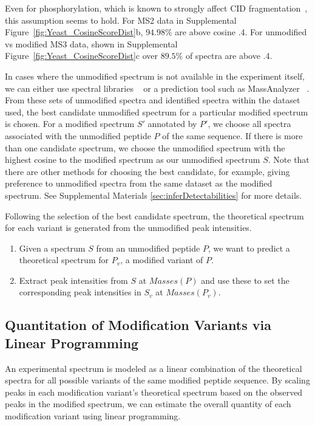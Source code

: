 \documentclass[11pt]{article}
\begin{document}
{Even for phosphorylation, which is known to strongly affect CID fragmentation~\cite{Tholey1999,Moyer2002}, this assumption seems to hold. For MS2 data in Supplemental Figure~\ref{fig:Yeast_CosineScoreDist}b, $94.98\%$ are above cosine .4. For unmodified vs modified MS3 data, shown in Supplemental Figure~\ref{fig:Yeast_CosineScoreDist}c over $89.5\%$ of spectra are above .4.

In cases where the unmodified spectrum is not available in the experiment itself, we can either use spectral libraries ~\cite{speclib_nist_human_yeast} or a prediction tool such as MassAnalyzer ~\cite{zhang04,zhang05,zhang10}. From these sets of unmodified spectra and identified spectra within the dataset used, the best candidate unmodified spectrum for a particular modified spectrum is chosen. For a modified spectrum $S'$ annotated by $P'$, we choose all spectra associated with the unmodified peptide $P$ of the same sequence. If there is more than one candidate spectrum, we choose the unmodified spectrum with the highest cosine to the modified spectrum as our unmodified spectrum $S$. Note that there are other methods for choosing the best candidate, for example, giving preference to unmodified spectra from the same dataset as the modified spectrum. See Supplemental Materials \ref{sec:inferDetectabilities} for more details.

Following the selection of the best candidate spectrum, the theoretical spectrum for each variant is generated from the unmodified peak intensities.

\begin{enumerate}
\item Given a spectrum $S$ from an unmodified peptide $P$, we want to predict a theoretical spectrum for $P_v$, a modified variant of $P$.
\item Extract peak intensities from $S$ at $Masses(P)$ and use these to set the corresponding peak intensities in $S_v$ at $Masses(P_v)$.
\end{enumerate}

\subsection{Quantitation of Modification Variants via Linear Programming}\label{sec:quantificationLP}
An experimental spectrum is modeled as a linear combination of the theoretical spectra for all possible variants of the same modified peptide sequence. By scaling peaks in each modification variant's theoretical spectrum based on the observed peaks in the modified spectrum, we can estimate the overall quantity of each modification variant using linear programming.

}
\end{document}
